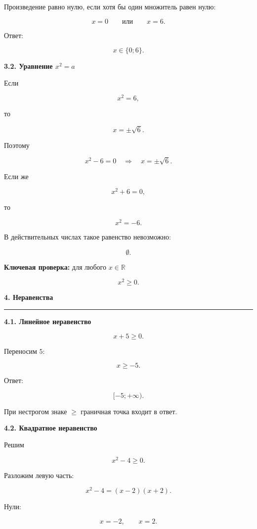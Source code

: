 \documentclass[a4paper,12pt]{article}
\newcommand{\MainSection}[1]{%
  \vspace{0.7em}
  {\Large\bfseries\color{darkaccent}#1\par}
  \vspace{0.25em}
  {\color{accent}\rule{\linewidth}{0.6pt}}
  \vspace{0.5em}
}
\newcommand{\SubSection}[1]{%
  \vspace{0.5em}
  {\large\bfseries\color{accent}#1\par}
  \vspace{0.2em}
}
\newcommand{\important}[1]{\textbf{\color{darkaccent}#1}}
\newcommand{\R}{\mathbb{R}}
\begin{document}
Произведение равно нулю, если хотя бы один множитель равен нулю:

\[
x=0
\qquad\text{или}\qquad
x=6.
\]

Ответ:

\[
\boxed{x\in\{0;6\}}.
\]


\SubSection{3.2. Уравнение \(x^2=a\)}

Если

\[
x^2=6,
\]

то

\[
x=\pm\sqrt6.
\]

Поэтому

\[
x^2-6=0
\quad\Longrightarrow\quad
x=\pm\sqrt6.
\]

Если же

\[
x^2+6=0,
\]

то

\[
x^2=-6.
\]

В действительных числах такое равенство невозможно:

\[
\boxed{\emptyset}.
\]

\important{Ключевая проверка:}
для любого \(x\in\R\)

\[
x^2\ge 0.
\]


\MainSection{4. Неравенства}

\SubSection{4.1. Линейное неравенство}

\[
x+5\ge 0.
\]

Переносим \(5\):

\[
x\ge -5.
\]

Ответ:

\[
\boxed{[-5;+\infty)}.
\]

При нестрогом знаке \(\ge\) граничная точка входит в ответ.


\SubSection{4.2. Квадратное неравенство}

Решим

\[
x^2-4\ge 0.
\]

Разложим левую часть:

\[
x^2-4=(x-2)(x+2).
\]

Нули:

\[
x=-2,
\qquad
x=2.
\]
\end{document}

